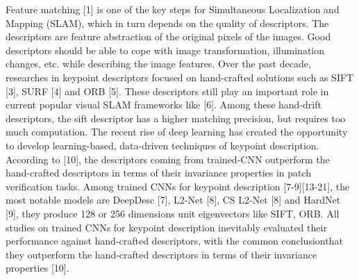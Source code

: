 \documentclass[letterpaper, 10 pt, conference]{ieeeconf}  %
\begin{document}
Feature matching [1] is one of the key steps for Simultaneous Localization and Mapping (SLAM), which in turn depends on the quality of descriptors. The descriptors are feature abstraction of the original pixels of the images. Good descriptors should be able to cope with image transformation, illumination changes, etc. while describing the image features.
Over the past decade, researches in keypoint descriptors focused on hand-crafted solutions such as SIFT [3], SURF [4] and ORB [5]. These descriptors still play an important role in current popular visual SLAM frameworks like [6]. Among these hand-drift descriptors, the sift descriptor has a higher matching precision, but requires too much computation. 
The recent rise of deep learning has created the opportunity to develop learning-based, data-driven techniques of keypoint description. According to [10], the descriptors coming from trained-CNN outperform the hand-crafted descriptors in terms of their invariance properties in patch verification tasks. Among trained CNNs for keypoint description [7-9][13-21], the most notable models are DeepDesc [7], L2-Net [8], CS L2-Net [8] and HardNet [9], they produce 128 or 256 dimensions unit eigenvectors like SIFT, ORB. All studies on trained CNNs for keypoint description inevitably evaluated their performance against hand-crafted descriptors, with the common conclusionthat they outperform the hand-crafted descriptors in terms of their invariance properties [10].
\end{document}
